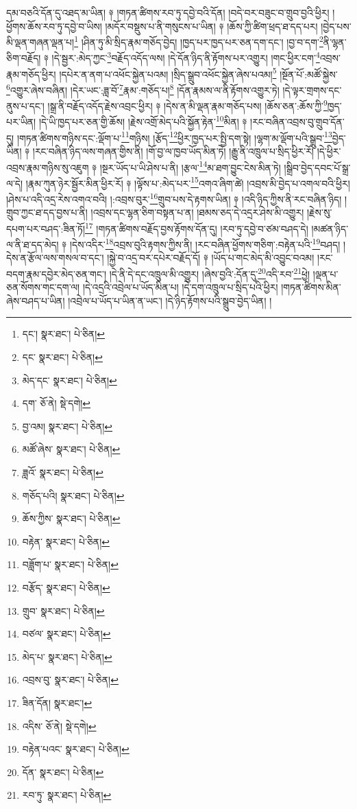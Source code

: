 དམ་བཅའི་དོན་དུ་འཐད་མ་ཡིན། ༈ །གཏན་ཚིགས་རབ་ཏུ་དབྱེ་བའི་དོན། །བདེ་བར་བཟུང་བ་གྲུབ་བྱའི་ཕྱིར། །ཕྱོགས་ཆོས་རབ་ཏུ་དབྱེ་བ་ཡིས། །མདོར་བསྡུས་པ་ནི་གསུངས་པ་ཡིན། ༈ །ཆོས་ཀྱི་ཚིག་ཕྲད་ཐ་དད་པར། །བྱེད་པས་མི་ལྡན་གཞན་ལྡན་པ།\footnote{དང་།  སྣར་ཐང་།  པེ་ཅིན། } །ཤིན་ཏུ་མི་སྲིད་རྣམ་གཅོད་བྱེད། །ཁྱད་པར་ཁྱད་པར་ཅན་དག་དང་། །བྱ་བ་དག་\footnote{དང་  སྣར་ཐང་།  པེ་ཅིན། }ནི་ལྷན་ཅིག་བརྗོད། ༈ །དེ་སྦྱར་:མེད་ཀྱང་\footnote{མེད་དང་  སྣར་ཐང་།  པེ་ཅིན། }བརྗོད་འདོད་ལས། །དེ་དོན་ཉིད་ནི་རྟོགས་པར་འགྱུར། །གང་ཕྱིར་ངག་\footnote{དག་  ཅོ་ནེ།  སྡེ་དགེ། }འབྲས་རྣམ་གཅོད་ཕྱིར། །དཔེར་ན་ནག་པ་འཕོང་སྐྱེན་པའམ། །སྲིད་སྒྲུབ་འཕོང་སྐྱེན་ཞེས་པའམ།\footnote{བྱ་འམ།  སྣར་ཐང་།  པེ་ཅིན། } །སྔོན་པོ་:མཚོ་སྐྱེས་\footnote{མཚོ་ཞེས་  སྣར་ཐང་།  པེ་ཅིན། }འགྱུར་ཞེས་བཞིན། །དེར་ཡང་:ཟླ་བོ་\footnote{ཟླའོ་  སྣར་ཐང་།  པེ་ཅིན། }རྣམ་:གཅོད་པ།\footnote{གཅོད་པའི།  སྣར་ཐང་།  པེ་ཅིན། } །དོན་རྣམས་ལ་ནི་རྟོགས་འགྱུར་ཏེ། །དེ་ལྟར་གྲགས་དང་ནུས་པ་དང་། །སྒྲ་ནི་བརྗོད་འདོད་རྗེས་འབྲང་ཕྱིར། ༈ །དེས་ན་མི་ལྡན་རྣམ་གཅོད་པས། །ཆོས་ཅན་:ཆོས་ཀྱི་\footnote{ཆོས་ཀྱིས་  སྣར་ཐང་།  པེ་ཅིན། }ཁྱད་པར་ཡིན། །དེ་ཡི་ཁྱད་པར་ཅན་གྱི་ཆོས། །རྗེས་འགྲོ་མེད་པའི་སྐྱོན་རྟེན་\footnote{བརྟེན་  སྣར་ཐང་།  པེ་ཅིན། }མིན། ༈ །རང་བཞིན་འབྲས་བུ་གྲུབ་དོན་དུ། །གཏན་ཚིགས་གཉིས་དང་:ལྡོག་པ་\footnote{བཟློག་པ་  སྣར་ཐང་།  པེ་ཅིན། }གཉིས། །རྩོད་\footnote{བརྩོད་  སྣར་ཐང་།  པེ་ཅིན། }ཕྱིར་ཁྱད་པར་སྤྱི་དག་སྟེ། །ལྷག་མ་ལྡོག་པའི་སྒྲུབ་\footnote{གྲུབ་  སྣར་ཐང་།  པེ་ཅིན། }བྱེད་ཡིན། ༈ །རང་བཞིན་ཉིད་ལས་གཞན་གྱིས་ནི། །གོ་བྱ་ལ་ཁྱབ་ཡོད་མིན་ཏེ། །རྒྱུ་ནི་འཁྲུལ་པ་སྲིད་ཕྱིར་རོ། །དེ་ཕྱིར་འབྲས་རྣམ་གཉིས་སུ་འཇུག ༈ །སྔར་ཡོད་པ་ཡི་ཤེས་པ་ནི། །རྩལ་\footnote{བཙལ་  སྣར་ཐང་།  པེ་ཅིན། }མ་ཐག་བྱུང་ངེས་མིན་ཏེ། །སྒྲིབ་བྱེད་དབང་པོ་སྒྲ་ལ་དེ། །རྣམ་ཀུན་ཉེར་སྦྱོར་མིན་ཕྱིར་རོ། ༈ །ལྟོས་པ་:མེད་པར་\footnote{མེད་པ་  སྣར་ཐང་།  པེ་ཅིན། }འགའ་ཞིག་ཚེ། །འབྲས་མི་བྱེད་པ་འགལ་བའི་ཕྱིར། །ཤེས་པ་འདི་འདྲ་རེས་འགའ་བའི། །:འབྲས་བུར་\footnote{འབྲས་བུ་  སྣར་ཐང་།  པེ་ཅིན། }གྲུབ་པས་དེ་རྟགས་ཡིན། ༈ །འདི་ཉིད་ཀྱིས་ནི་རང་བཞིན་ཉིད། །གྲུབ་ཀྱང་ཐ་དད་བྱས་པ་ནི། །འབྲས་དང་ལྷན་ཅིག་བསྟན་པ་ན། །ཐམས་ཅད་དེ་འདྲར་ཤེས་མི་འགྱུར། །རྗེས་སུ་དཔག་པར་བཤད་:ཟིན་ཏོ།\footnote{ཟིན་དོན།  སྣར་ཐང་། } །གཏན་ཚིགས་བརྗོད་བྱས་རྟོགས་དོན་དུ། །རབ་ཏུ་དབྱེ་བ་ཙམ་བཤད་དེ། །མཚན་ཉིད་ལ་ནི་ཐ་དད་མེད། ༈ །དེས་འདིར་\footnote{འདིས་  ཅོ་ནེ།  སྡེ་དགེ། }འབྲས་བུའི་རྟགས་ཀྱིས་ནི། །རང་བཞིན་ཕྱོགས་གཅིག་:བརྟེན་པའི་\footnote{བརྟེན་པའང་  སྣར་ཐང་།  པེ་ཅིན། }བཤད། །དེས་ན་རྩོལ་ལས་གསལ་བ་དང་། །སྐྱེ་བ་འདྲ་བར་དཔེར་བརྗོད་དོ། ༈ །ཡོད་པ་གང་མེད་མི་འབྱུང་བའམ། །རང་བདག་རྣམ་དབྱེར་མེད་ཅན་གང་། །དེ་ནི་དེ་དང་འཁྲུལ་མི་འགྱུར། །ཞེས་བྱའི་:དོན་དུ་\footnote{དོན་  སྣར་ཐང་།  པེ་ཅིན། }འདི་རབ་\footnote{རབ་ཏུ་  སྣར་ཐང་།  པེ་ཅིན། }ཕྱེ། །ལྡན་པ་ཅན་སོགས་གང་དག་ལ། །དེ་འདྲའི་འབྲེལ་པ་ཡོད་མིན་པ། །དེ་དག་འཁྲུལ་པ་སྲིད་པའི་ཕྱིར། །གཏན་ཚིགས་མིན་ཞེས་བཤད་པ་ཡིན། །འབྲེལ་པ་ཡོད་པ་ཡིན་ན་ཡང་། །དེ་ཉིད་རྟོགས་པའི་སྒྲུབ་བྱེད་ཡིན། །

